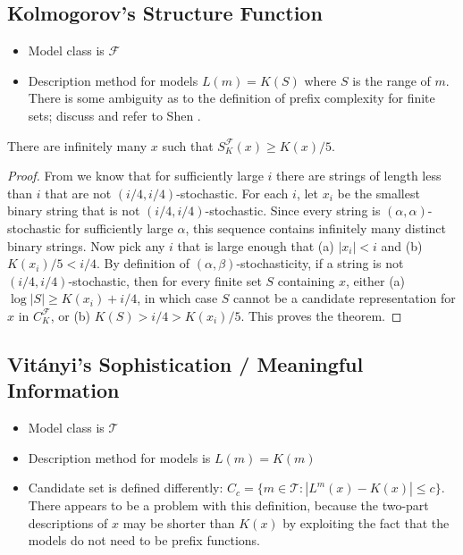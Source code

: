 \documentclass{style/llncs}
\newcommand{\T}{\mathcal T}
\newcommand{\F}{\mathcal F}
\begin{document}
\subsection{Kolmogorov's Structure Function}

\begin{itemize}
\item Model class is $\F$
\item Description method for models $L(m)=K(S)$ where $S$ is the range
  of $m$. There is some ambiguity as to the definition of prefix
  complexity for finite sets; discuss and refer to Shen \cite{TODO}.
\end{itemize}

\begin{theorem}
There are infinitely many $x$ such that $S^\F_K(x) \geq K(x)/5$. \label{theorem:structure-function-is-not-bounded}
\end{theorem}
\begin{proof}
From \cite[Proposition~I.3 (b)]{gacs2001algorithmic} we know that for sufficiently large $i$ there are strings of length less than $i$ that are not $(i/4, i/4)$-stochastic. For each $i$, let $x_i$ be the smallest binary string that is not $(i/4, i/4)$-stochastic. Since every string is $(\alpha,\alpha)$-stochastic for sufficiently large $\alpha$, this sequence contains infinitely many distinct binary strings. Now pick any $i$ that is large enough that (a) $|x_i|<i$ and (b) $K(x_i)/5 < i/4$. By definition of $(\alpha,\beta)$-stochasticity, if a string is not $(i/4,i/4)$-stochastic, then for every finite set $S$ containing $x$, either (a) $\log|S|\ge K(x_i)+i/4$, in which case $S$ cannot be a candidate representation for $x$ in $C^\F_K$, or (b) $K(S)>i/4>K(x_i)/5$. This proves the theorem.
\end{proof}

\subsection{Vit\'anyi's Sophistication / Meaningful Information}

\begin{itemize}
\item Model class is $\T$
\item Description method for models is $L(m)=K(m)$
\item Candidate set is defined differently: $C_c=\{m\in\T:|L^m(x)-K(x)|\le
  c\}$. There appears to be a problem with this definition, because
  the two-part descriptions of $x$ may be shorter than $K(x)$ by
  exploiting the fact that the models do not need to be prefix functions.
\end{itemize}
\end{document}
